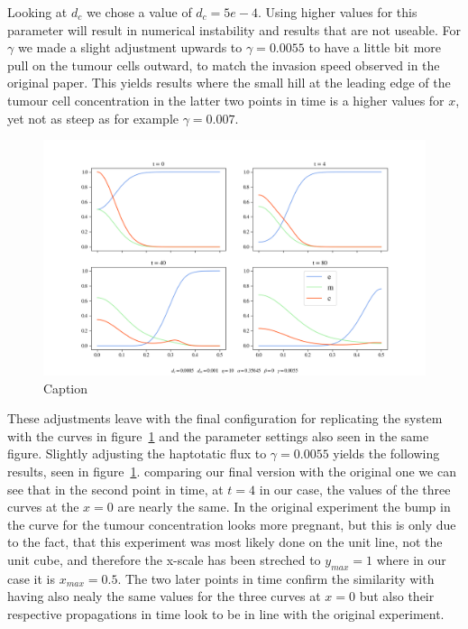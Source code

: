 Looking at $d_c$ we chose a value of $d_c=5e-4$. Using higher values for this parameter will result in numerical instability and results that are not useable. For $\gamma$ we made a slight adjustment upwards to $\gamma=0.0055$ to have a little bit more pull on the tumour cells outward, to match the invasion speed observed in the original paper. This yields results where the small hill at the leading edge of the tumour cell concentration in the latter two points in time is a higher values for $x$, yet not as steep as for example $\gamma = 0.007$. \newline 
\begin{figure}[t]
    \centering
    \includegraphics[width=\textwidth]{resources/images/2D_5e-4_1e-3_1e-3_10_0.35645_0_0.0055_1e-2_10_plot.png}
    \caption{Caption}
    \label{fig:2D_5e-4_1e-3_1e-3_10_0.35645_0_0.0055}
\end{figure}
These adjustments leave with the final configuration for replicating the system with the curves in figure~\ref{fig:2D_5e-4_1e-3_1e-3_10_0.35645_0_0.0055} and the parameter settings also seen in the same figure.
Slightly adjusting the haptotatic flux to $\gamma=0.0055$ yields the following results, seen in figure~\ref{fig:2D_5e-4_1e-3_1e-3_10_0.35645_0_0.0055}. comparing our final version with the original one we can see that in the second point in time, at $t=4$ in our case, the values of the three curves at the $x=0$ are nearly the same. In the original experiment the bump in the curve for the tumour concentration looks more pregnant, but this is only due to the fact, that this experiment was most likely done on the unit line, not the unit cube, and therefore the x-scale has been streched to $y_{max}=1$ where in our case it is $x_{max} = 0.5$. The two later points in time confirm the similarity with having also nealy the same values for the three curves at $x=0$ but also their respective propagations in time look to be in line with the original experiment. 



